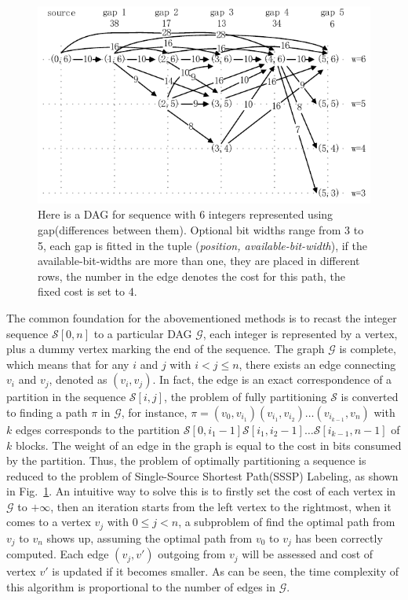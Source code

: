 \documentclass[runningheads,a4paper]{llncs}
\begin{document}
\begin{figure}
	\centering
	\includegraphics[width=0.9\linewidth]{sssp}
	\caption[sssp]{Here is a DAG for sequence with 6 integers represented using gap(differences between them). Optional bit widths range from 3 to 5, each gap is fitted in the tuple (\textit{position, available-bit-width}), if the available-bit-widths are more than one, they are placed in different rows, the number in the edge denotes the cost for this path, the fixed cost is set to 4.}
	\label{fig:sssp}
\end{figure}

The common foundation for the abovementioned methods is to recast the integer sequence $\mathcal{S} \left[ 0,n \right]$ to a particular DAG $\mathcal{G}$, each integer is represented by a vertex, plus a dummy vertex marking the end of the sequence.
The graph $\mathcal{G}$ is complete, which means that for any $i$ and $j$ with $i < j \leqslant n$, there exists an edge connecting $v_{i}$ and $v_{j}$, denoted as $\left( v_{i}, v_{j} \right)$.
In fact, the edge is an exact correspondence of a partition in the sequence $\mathcal{S}\left[i,j \right] $, the problem of fully partitioning $\mathcal{S}$ is converted to finding a path $\pi$ in $\mathcal{G}$, for instance, $\pi=\left( v_{0}, v_{i_{1}} \right) \left( v_{i_{1}}, v_{i_{2}} \right)\ldots\left( v_{i_{k-1}}, v_{n} \right)$ with $k$ edges corresponds to the partition $\mathcal{S}\left[0,i_{1}-1 \right]\mathcal{S}\left[i_{1},i_{2}-1 \right] \ldots\mathcal{S}\left[i_{k-1},n-1\right] $ of $k$ blocks.
The weight of an edge in the graph is equal to the cost in bits consumed by the partition.
Thus, the problem of optimally partitioning a sequence is reduced to the problem of Single-Source Shortest Path(SSSP) Labeling, as shown in Fig.~\ref{fig:sssp}.
An intuitive way to solve this is to firstly set the cost of each vertex in $\mathcal{G}$ to $+\infty$, then an iteration starts from the left vertex to the rightmost, when it comes to a vertex $v_{j}$ with $0\leqslant j < n$, a subproblem of find the optimal path from $v_{j}$ to $v_{n}$ shows up, assuming the optimal path from $v_{0}$ to $v_{j}$ has been correctly computed.
Each edge $\left( v_{j},v'\right)$ outgoing from $v_{j}$ will be assessed and cost of vertex $v'$ is updated if it becomes smaller.
As can be seen, the time complexity of this algorithm is proportional to the number of edges in $\mathcal{G}$.
\end{document}
